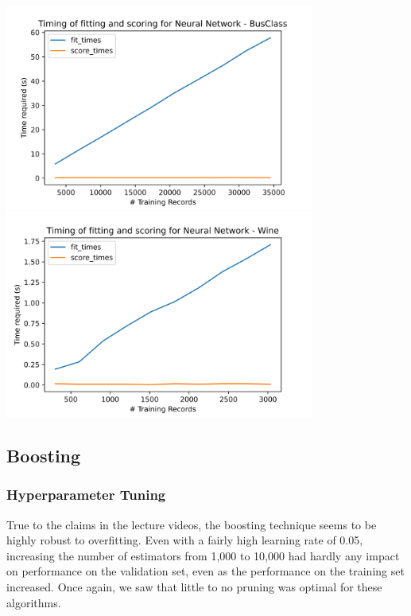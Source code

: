 \documentclass[
	letterpaper, %
]{jdf}
\begin{document}
\includegraphics[width=4in]{Figures/BusClass-0920/NN/time_curve.png}
\includegraphics[width=4in]{Figures/Wine-0921/NN/time_curve.png}


\subsection{Boosting}

\subsubsection{Hyperparameter Tuning}
True to the claims in the lecture videos, the boosting technique seems to be highly robust to overfitting. Even with a fairly high learning rate of 0.05, increasing the number of estimators from 1,000 to 10,000 had hardly any impact on performance on the validation set, even as the performance on the training set increased. Once again, we saw that little to no pruning was optimal for these algorithms.
\end{document}
